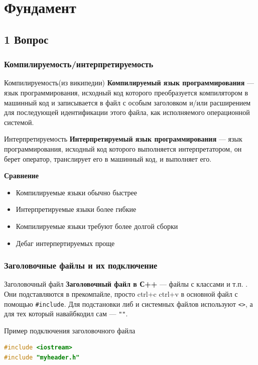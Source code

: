 
\section{Фундамент}
\subsection{1 Вопрос}
\subsubsection{Компилируемость/интерпретируемость}
\begin{definition}{Компилируемость(из википедии)}{}
\textbf{Компилируемый язык программирования} — язык программирования, исходный код которого преобразуется компилятором в машинный код и записывается в файл с особым заголовком и/или расширением для последующей идентификации этого файла, как исполняемого операционной системой.
\end{definition}
\begin{definition}{Интерпретируемость}{}
\textbf{Интерпретируемый язык программирования} — язык программирования, исходный код которого выполняется интерпретатором, он берет оператор, транслирует его в машинный код, и выполняет его.
\end{definition}
\textbf{Сравнение}
\begin{itemize}
    \item Компилируемые языки обычно быстрее
    \item Интерпретируемые языки более гибкие
    \item Компилируемые языки требуют более долгой сборки
    \item Дебаг интерпертируемых проще
\end{itemize}
\subsubsection{Заголовочные файлы и их подключение}
\begin{definition}{Заголовочный файл}{}
  \textbf{Заголовочный файл в С++} --- файлы с классами и т.п. . Они подставляются в прекомпайле, просто ctrl+c ctrl+v в основной файл с помощью \texttt{\#include}. Для подстановки либ и системных файлов используют \verb|<>|, а для тех который навайбкодил сам --- \verb|""|.
\end{definition}
\begin{implementation}{Пример подключения заголовочного файла}{}
\begin{lstlisting}[language=c++]
#include <iostream>
#include "myheader.h"
\end{lstlisting}
\end{implementation}
